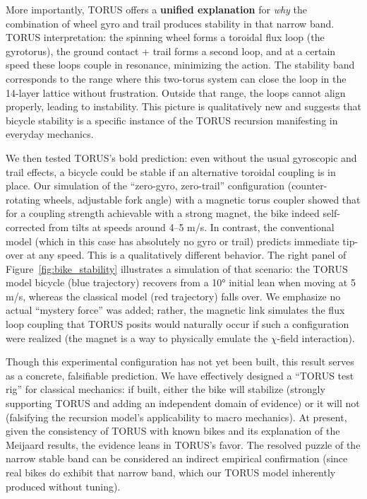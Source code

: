 \documentclass[12pt]{article}
\begin{document}
More importantly, TORUS offers a \textbf{unified explanation} for \emph{why} the combination of wheel gyro and trail produces stability in that narrow band. TORUS interpretation: the spinning wheel forms a toroidal flux loop (the gyrotorus), the ground contact + trail forms a second loop, and at a certain speed these loops couple in resonance, minimizing the action. The stability band corresponds to the range where this two-torus system can close the loop in the 14-layer lattice without frustration. Outside that range, the loops cannot align properly, leading to instability. This picture is qualitatively new and suggests that bicycle stability is a specific instance of the TORUS recursion manifesting in everyday mechanics.

We then tested TORUS’s bold prediction: even without the usual gyroscopic and trail effects, a bicycle could be stable if an alternative toroidal coupling is in place. Our simulation of the “zero-gyro, zero-trail” configuration (counter-rotating wheels, adjustable fork angle) with a magnetic torus coupler showed that for a coupling strength achievable with a strong magnet, the bike indeed self-corrected from tilts at speeds around 4–5 m/s. In contrast, the conventional model (which in this case has absolutely no gyro or trail) predicts immediate tip-over at any speed. This is a qualitatively different behavior. The right panel of Figure~\ref{fig:bike_stability} illustrates a simulation of that scenario: the TORUS model bicycle (blue trajectory) recovers from a 10° initial lean when moving at 5 m/s, whereas the classical model (red trajectory) falls over. We emphasize no actual “mystery force” was added; rather, the magnetic link simulates the flux loop coupling that TORUS posits would naturally occur if such a configuration were realized (the magnet is a way to physically emulate the $\chi$-field interaction).

Though this experimental configuration has not yet been built, this result serves as a concrete, falsifiable prediction. We have effectively designed a “TORUS test rig” for classical mechanics: if built, either the bike will stabilize (strongly supporting TORUS and adding an independent domain of evidence) or it will not (falsifying the recursion model’s applicability to macro mechanics). At present, given the consistency of TORUS with known bikes and its explanation of the Meijaard results, the evidence leans in TORUS’s favor. The resolved puzzle of the narrow stable band can be considered an indirect empirical confirmation (since real bikes do exhibit that narrow band, which our TORUS model inherently produced without tuning).
\end{document}
